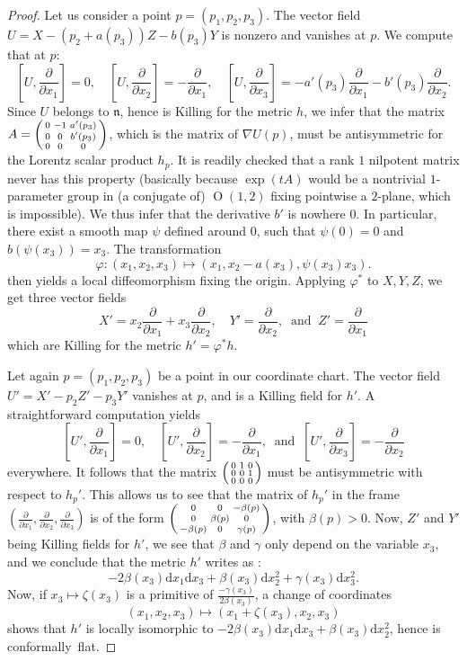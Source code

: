 \documentclass[11pt]{article}
\theoremstyle{definition}
\numberwithin{equation}{section}
\numberwithin{figure}{section}
\numberwithin{table}{section}
\DeclareMathOperator{\Omp}{O}%
\newcommand{\lien}{{\mathfrak{n}}}
\newcommand{\delx}{{\frac{\partial}{\partial x_1}}}
\newcommand{\dely}{{\frac{\partial}{\partial x_2}}}
\newcommand{\delz}{{\frac{\partial}{\partial x_3}}}
\newenvironment{smallpmatrix}{\left(\begin{smallmatrix}}{\end{smallmatrix}\right)}
\newcommand*{\dd}{\mathrm{d}}
\newcommand*{\dx}{\dd x}
\begin{document}
\begin{proof}
Let us consider a point $p=(p_1,p_2,p_3)$. The vector field $U=X-(p_2+a(p_3))Z-b(p_3)Y$ is nonzero and vanishes at $p$. We compute that at $p$:
\[
\left[U,\delx\right]=0, \quad \left[U,\dely\right]=- \delx,\quad \left[U,\delz\right]=-a'(p_3)\delx-b'(p_3)\dely.
\]
Since $U$ belongs to $\lien$, hence is Killing for the metric $h$, we infer that the matrix $A=\begin{smallpmatrix}
0&-1&a'(p_3)\\
0&0&b'(p_3)\\
0&0&0\\
\end{smallpmatrix}$, which is the matrix of $\nabla U(p)$, must be antisymmetric for the Lorentz scalar product $h_p$. It is readily checked that a rank $1$ nilpotent matrix never has this property (basically because $\exp(tA)$ would be a nontrivial $1$-parameter group in (a conjugate of) $\Omp(1,2)$ fixing pointwise a $2$-plane, which is impossible). We thus infer that the derivative $b'$ is nowhere $0$. In particular, there exist a smooth map $\psi $ defined around $0$, such that $\psi(0)=0$ and $b(\psi(x_3))=x_3$. The transformation
\[
\varphi: (x_1,x_2,x_3) \mapsto (x_1,x_2 -a(x_3),\psi(x_3)x_3).
\]
then yields a local diffeomorphism fixing the origin. Applying $\varphi^*$ to $X,Y,Z$, we get three vector fields
\[
X'=x_2 \delx+x_3 \dely, \quad Y'=\dely,\ \text{ and }\ Z'=\delx
\]
which are Killing for the metric $h'=\varphi^*h$.

Let again $p=(p_1,p_2,p_3)$ be a point in our coordinate chart. The vector field $U'=X'-p_2 Z'-p_3Y'$ vanishes at $p$, and is a Killing field for $h'$. A straightforward computation yields
\[
[U',\delx]=0, \quad [U',\dely]=-\delx,\ \text{ and }\ [U',\delz]=-\dely
\]
everywhere. It follows that the matrix $
\begin{smallpmatrix}
0&1&0\\
0&0&1\\
0&0&0\\
\end{smallpmatrix} $ must be antisymmetric with respect to $h_p'$. This allows us to see that the matrix of $h_p'$ in the frame $(\delx,\dely,\delz)$ is of the form $
\begin{smallpmatrix}
0&0&-\beta(p)\\
0&\beta(p)&0\\
-\beta(p)&0&\gamma(p)\\
\end{smallpmatrix}$, with $\beta(p) >0$. Now, $Z'$ and $Y'$ being Killing fields for $h'$, we see that $\beta$ and $\gamma$ only depend on the variable $x_3$, and we conclude that the metric $h'$ writes as :
\[
-2 \beta(x_3)\dx_1\dx_3+\beta(x_3)\dx_2^2+\gamma(x_3)\dx_3^2.
\]
Now, if $x_3 \mapsto \zeta(x_3)$ is a primitive of $\frac{-\gamma(x_3)}{2 \beta(x_3)}$, a change of coordinates
\[
(x_1,x_2,x_3) \mapsto (x_1+\zeta(x_3),x_2,x_3)
\]
shows that $h'$ is locally isomorphic to
$-2\beta(x_3)\dx_1\dx_3+\beta(x_3)\dx_2^2$, hence is conformally~flat.
\end{proof}
\end{document}
